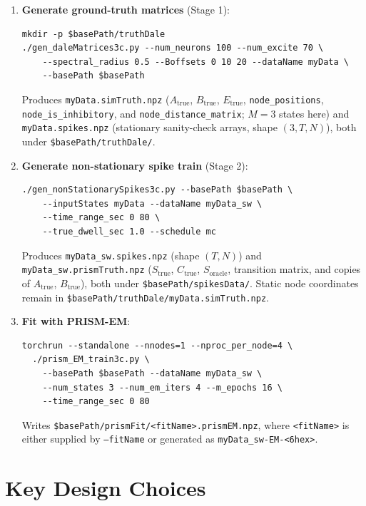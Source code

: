 \documentclass[11pt]{article}
\begin{document}
\begin{enumerate}

\item \textbf{Generate ground-truth matrices} (Stage 1):
\begin{verbatim}
mkdir -p $basePath/truthDale
./gen_daleMatrices3c.py --num_neurons 100 --num_excite 70 \
    --spectral_radius 0.5 --Boffsets 0 10 20 --dataName myData \
    --basePath $basePath
\end{verbatim}
Produces \texttt{myData.simTruth.npz} ($A_{\text{true}}$,
$B_{\text{true}}$, $E_{\text{true}}$, \texttt{node\_positions},
\texttt{node\_is\_inhibitory}, and \texttt{node\_distance\_matrix};
$M=3$ states here) and
\texttt{myData.spikes.npz} (stationary sanity-check arrays,
shape $(3, T, N)$), both under \texttt{\$basePath/truthDale/}.

\item \textbf{Generate non-stationary spike train} (Stage 2):
\begin{verbatim}
./gen_nonStationarySpikes3c.py --basePath $basePath \
    --inputStates myData --dataName myData_sw \
    --time_range_sec 0 80 \
    --true_dwell_sec 1.0 --schedule mc
\end{verbatim}
Produces \texttt{myData\_sw.spikes.npz} (shape $(T, N)$) and
\texttt{myData\_sw.prismTruth.npz} ($S_{\text{true}}$,
$C_{\text{true}}$, $S_{\text{oracle}}$, transition matrix, and
copies of $A_{\text{true}}$, $B_{\text{true}}$), both under
\texttt{\$basePath/spikesData/}. Static node coordinates remain in
\texttt{\$basePath/truthDale/myData.simTruth.npz}.

\item \textbf{Fit with PRISM-EM}:
\begin{verbatim}
torchrun --standalone --nnodes=1 --nproc_per_node=4 \
  ./prism_EM_train3c.py \
    --basePath $basePath --dataName myData_sw \
    --num_states 3 --num_em_iters 4 --m_epochs 16 \
    --time_range_sec 0 80
\end{verbatim}
Writes \texttt{\$basePath/prismFit/<fitName>.prismEM.npz}, where
\texttt{<fitName>} is either supplied by \texttt{--fitName} or generated as
\texttt{myData\_sw-EM-<6hex>}.

\end{enumerate}

\section{Key Design Choices}
\label{sec:design}
\end{document}
